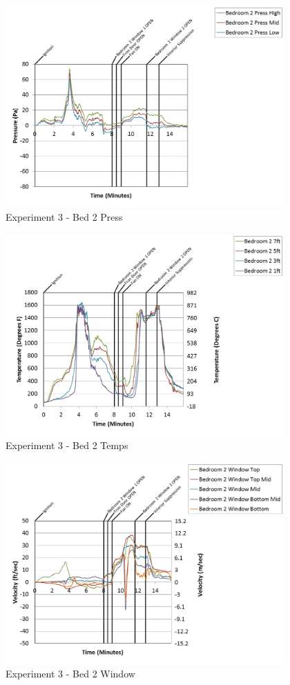 \documentclass{article}
\begin{document}
\begin{appendices}
\begin{figure}[h!]
	\centering
	\includegraphics[height=3.05in]{0_Images/Results_Charts/Exp_3_Charts/Bed2Press.png}
	\caption{Experiment 3 - Bed 2 Press}
\end{figure}

\clearpage

\begin{figure}[h!]
	\centering
	\includegraphics[height=3.05in]{0_Images/Results_Charts/Exp_3_Charts/Bed2Temps.png}
	\caption{Experiment 3 - Bed 2 Temps}
\end{figure}


\begin{figure}[h!]
	\centering
	\includegraphics[height=3.05in]{0_Images/Results_Charts/Exp_3_Charts/Bed2Window.png}
	\caption{Experiment 3 - Bed 2 Window}
\end{figure}


\end{appendices}
\end{document}

